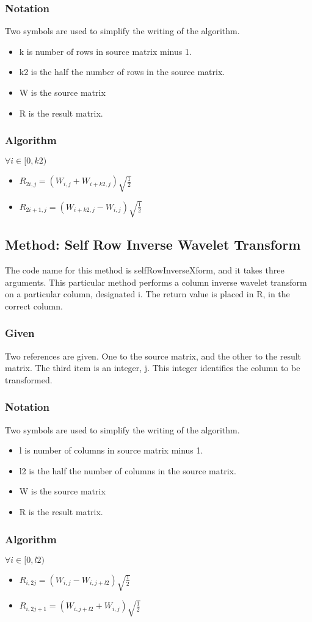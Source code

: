 \subsubsection {Notation}
Two symbols are used to simplify the writing of the algorithm.  
\begin {itemize}
\item k is number of rows in source matrix minus 1.
\item k2 is the half the number of rows in the source matrix.
\item W is the source matrix
\item R is the result matrix.
\end {itemize}

\subsubsection {Algorithm}

$\forall i \in [0,k2) $
\begin{itemize}
\item $R_{2i,j} = (W_{i,j} + W_{i+k2,j}) \sqrt {\frac{1}{2}}$
\item $R_{2i+1,j} = (W_{i+k2,j} -  W_{i,j}) \sqrt {\frac{1}{2}}$
\end{itemize}

\subsection {Method: Self Row Inverse Wavelet Transform }
The code name for this method is selfRowInverseXform, and it takes three arguments.  This particular method performs a column inverse wavelet transform on a particular column, designated i.  The return value is placed in R, in the correct column.  

\subsubsection {Given}
Two references are given.  One to the source matrix, and the other to the result matrix.  The third item is an integer, j.  This integer identifies the column to be transformed.

\subsubsection {Notation}
Two symbols are used to simplify the writing of the algorithm.  
\begin {itemize}
\item l is number of columns in source matrix minus 1.
\item l2 is the half the number of columns in the source matrix.
\item W is the source matrix
\item R is the result matrix.
\end {itemize}

\subsubsection {Algorithm}

$\forall i \in [0,l2) $
\begin{itemize}
\item $R_{i,2j} = (W_{i,j} - W_{i,j + l2}) \sqrt {\frac{1}{2}}$
\item $R_{i,2j + 1} = (W_{i,j + l2} +  W_{i,j}) \sqrt {\frac{1}{2}}$
\end{itemize}